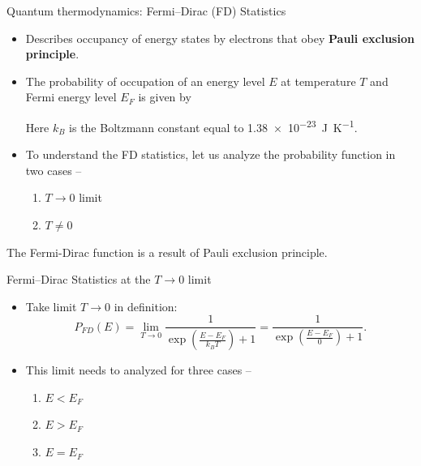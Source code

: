 %
%
\begin{frame}[label=pre-M2T1-slot1]{Quantum thermodynamics: Fermi--Dirac (FD) Statistics}
	\begin{itemize}
		\item Describes occupancy of energy states by electrons that obey \textbf{Pauli exclusion principle}.
		\item The probability of occupation of an energy level $E$ at temperature $T$ and Fermi energy level $E_F$ is given by
		\begin{center}
		\end{center}
		Here \(k_B\) is the Boltzmann constant equal to \SI{1.38e-23}{\joule\per\kelvin}.
		\item To understand the FD statistics, let us analyze the probability function in two cases --
		\begin{enumerate}
			\item \(T\rightarrow 0\) limit
			\item \(T\neq 0\)
		\end{enumerate}
	\end{itemize}
	\begin{keyinsight}
		The Fermi-Dirac function is a result of Pauli exclusion principle.
	\end{keyinsight}
\end{frame}
%
\begin{frame}[label=pre-M2T1-slot1]{Fermi--Dirac Statistics at the $T \to 0$ limit}
	\begin{itemize}
		\item Take limit $T\to 0$ in definition:
		\[
		P_{FD}(E) 
		=
		\lim_{T\rightarrow0}\frac{1}{\exp\left(\frac{E-E_F}{k_B T}\right) + 1}
		= \frac{1}{\exp\left(\frac{E-E_F}{0}\right) + 1}
		.
		\]
		\item This limit needs to analyzed for three cases --
		\begin{enumerate}
			\item  \(E<E_F\)
			\item \(E>E_F\)
			\item \(E=E_F\)
		\end{enumerate}
	\end{itemize}
\end{frame}
%
